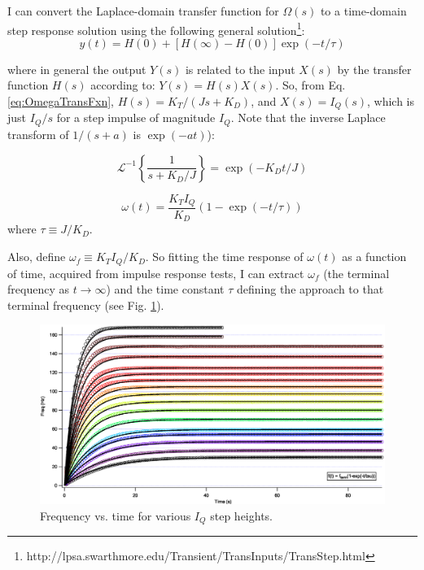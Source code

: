 \documentclass[11pt]{article} %
\begin{document}
I can convert the Laplace-domain transfer function for $\Omega(s)$ to a time-domain step response solution using the following general solution\footnote{http://lpsa.swarthmore.edu/Transient/TransInputs/TransStep.html}: 
\begin{equation}
y(t) = H(0) + [H(\infty) - H(0)]\exp(-t/\tau)
\end{equation}

\noindent where in general the output $Y(s)$ is related to the input $X(s)$ by the transfer function $H(s)$ according to: $Y(s) = H(s) X(s)$. So, from Eq. \ref{eq:OmegaTransFxn}, $H(s) = K_T/(J s + K_D)$, and $X(s) = I_Q(s)$, which is just $I_Q/s$ for a step impulse of magnitude $I_Q$. Note that the inverse Laplace transform of $1/(s + a)$ is $\exp(-a t)$):

\begin{equation}
\mathcal{L}^{-1}\left\{\frac{1}{s + K_D/J}\right\} = \exp(-K_D t/J)
\end{equation}

\begin{equation}
\omega(t) = \frac{K_T I_Q}{K_D} \left(1 - \exp(-t/\tau)\right)
\end{equation}
\noindent where $\tau \equiv J/K_D$. 

Also, define $\omega_f \equiv K_T I_Q/K_D$. So fitting the time response of $\omega(t)$ as a function of time, acquired from impulse response tests, I can extract $\omega_f$ (the terminal frequency as $t \rightarrow \infty$) and the time constant $\tau$ defining the approach to that terminal frequency (see Fig. \ref{fig:freqStepResponse}). 

\begin{figure}
\centering
\includegraphics[scale=0.5]{freqStepResponse.eps}
\caption{Frequency vs. time for various $I_Q$ step heights.}
\label{fig:freqStepResponse}
\end{figure}
\end{document}
